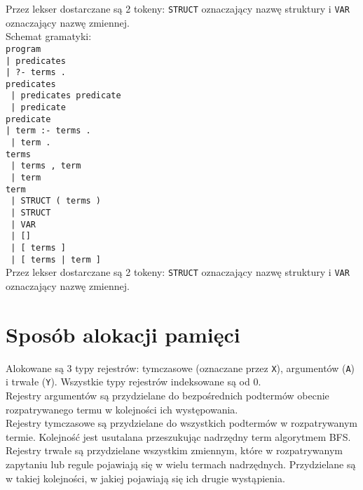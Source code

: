 Przez lekser dostarczane są 2 tokeny: \texttt{STRUCT} oznaczający nazwę struktury i \texttt{VAR} oznaczający nazwę zmiennej.\\
Schemat gramatyki:\\
\texttt{program}\\
\texttt{| predicates}\\
\texttt{| ?- terms .}\\
\texttt{predicates}\\
\texttt{                             | predicates predicate}\\
\texttt{                             | predicate}\\
\texttt{predicate}\\
\texttt{| term :- terms .}\\
\texttt{                             | term .}\\
\texttt{terms}\\
\texttt{                     | terms , term}\\
\texttt{                             | term}\\
\texttt{term}\\
\texttt{                     | STRUCT ( terms )}\\
\texttt{                             | STRUCT}\\
\texttt{                             | VAR}\\
\texttt{                             | []}\\
\texttt{                             | [ terms ]}\\
\texttt{                             | [ terms | term ]}\\

Przez lekser dostarczane są 2 tokeny: \texttt{STRUCT} oznaczający nazwę struktury i \texttt{VAR} oznaczający nazwę zmiennej.

\section{Sposób alokacji pamięci}

Alokowane są 3 typy rejestrów: tymczasowe (oznaczane przez \texttt{X}), argumentów (\texttt{A}) i trwałe (\texttt{Y}). Wszystkie typy rejestrów indeksowane są od 0.\\
Rejestry argumentów są przydzielane do bezpośrednich podtermów obecnie rozpatrywanego termu w kolejności ich występowania.\\
Rejestry tymczasowe są przydzielane do wszystkich podtermów w rozpatrywanym termie. Kolejność jest usutalana przeszukując nadrzędny term algorytmem BFS.\\
Rejestry trwałe są przydzielane wszystkim zmiennym, które w rozpatrywanym zapytaniu lub regule pojawiają się w wielu termach nadrzędnych. Przydzielane są w takiej kolejności, w jakiej pojawiają się ich drugie wystąpienia.